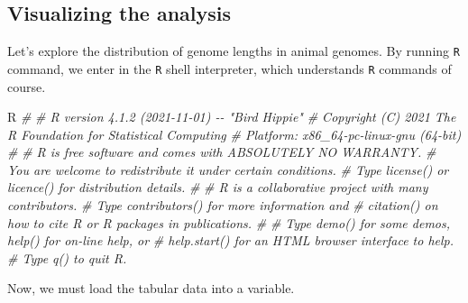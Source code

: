 \documentclass[10pt,a4paper,]{article}
\newenvironment{Shaded}{}{}
\newcommand{\CommentTok}[1]{\textcolor[rgb]{0.38,0.63,0.69}{\textit{#1}}}
\newcommand{\ExtensionTok}[1]{#1}
\begin{document}
\hypertarget{visualizing-the-analysis}{%
\subsection{Visualizing the analysis}\label{visualizing-the-analysis}}

Let's explore the distribution of genome lengths in animal genomes. By
running \texttt{R} command, we enter in the \texttt{R} shell
interpreter, which understands \texttt{R} commands of course.

\begin{Shaded}
\begin{Highlighting}[]
\ExtensionTok{R}
\CommentTok{\# }
\CommentTok{\# R version 4.1.2 (2021{-}11{-}01) {-}{-} "Bird Hippie"}
\CommentTok{\# Copyright (C) 2021 The R Foundation for Statistical Computing}
\CommentTok{\# Platform: x86\_64{-}pc{-}linux{-}gnu (64{-}bit)}
\CommentTok{\# }
\CommentTok{\# R is free software and comes with ABSOLUTELY NO WARRANTY.}
\CommentTok{\# You are welcome to redistribute it under certain conditions.}
\CommentTok{\# Type \textquotesingle{}license()\textquotesingle{} or \textquotesingle{}licence()\textquotesingle{} for distribution details.}
\CommentTok{\# }
\CommentTok{\# R is a collaborative project with many contributors.}
\CommentTok{\# Type \textquotesingle{}contributors()\textquotesingle{} for more information and}
\CommentTok{\# \textquotesingle{}citation()\textquotesingle{} on how to cite R or R packages in publications.}
\CommentTok{\# }
\CommentTok{\# Type \textquotesingle{}demo()\textquotesingle{} for some demos, \textquotesingle{}help()\textquotesingle{} for on{-}line help, or}
\CommentTok{\# \textquotesingle{}help.start()\textquotesingle{} for an HTML browser interface to help.}
\CommentTok{\# Type \textquotesingle{}q()\textquotesingle{} to quit R.}
\end{Highlighting}
\end{Shaded}

Now, we must load the tabular data into a variable.
\end{document}
